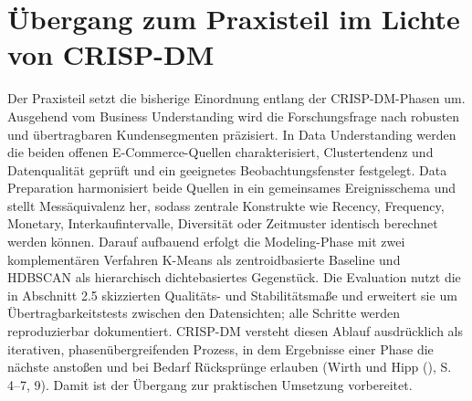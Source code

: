 \documentclass[
  11pt,
  openany, oneside]{book}
\begin{document}
\section{Übergang zum Praxisteil im Lichte von
CRISP-DM}\label{sec-uebergang}

Der Praxisteil setzt die bisherige Einordnung entlang der
CRISP-DM-Phasen um. Ausgehend vom Business Understanding wird die
Forschungsfrage nach robusten und übertragbaren Kundensegmenten
präzisiert. In Data Understanding werden die beiden offenen
E-Commerce-Quellen charakterisiert, Clustertendenz und Datenqualität
geprüft und ein geeignetes Beobachtungsfenster festgelegt. Data
Preparation harmonisiert beide Quellen in ein gemeinsames Ereignisschema
und stellt Messäquivalenz her, sodass zentrale Konstrukte wie Recency,
Frequency, Monetary, Interkaufintervalle, Diversität oder Zeitmuster
identisch berechnet werden können. Darauf aufbauend erfolgt die
Modeling-Phase mit zwei komplementären Verfahren K-Means als
zentroidbasierte Baseline und HDBSCAN als hierarchisch dichtebasiertes
Gegenstück. Die Evaluation nutzt die in Abschnitt 2.5 skizzierten
Qualitäts- und Stabilitätsmaße und erweitert sie um
Übertragbarkeitstests zwischen den Datensichten; alle Schritte werden
reproduzierbar dokumentiert. CRISP-DM versteht diesen Ablauf
ausdrücklich als iterativen, phasenübergreifenden Prozess, in dem
Ergebnisse einer Phase die nächste anstoßen und bei Bedarf Rücksprünge
erlauben (Wirth und Hipp
(), S. 4--7, 9).
Damit ist der Übergang zur praktischen Umsetzung vorbereitet.
\end{document}
